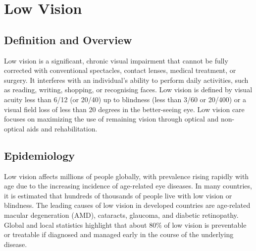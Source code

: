 \chapter{Low Vision}

\section*{Definition and Overview}
Low vision is a significant, chronic visual impairment that cannot be fully corrected with conventional spectacles, contact lenses, medical treatment, or surgery. It interferes with an individual's ability to perform daily activities, such as reading, writing, shopping, or recognising faces. Low vision is defined by visual acuity less than 6/12 (or 20/40) up to blindness (less than 3/60 or 20/400) or a visual field loss of less than 20 degrees in the better-seeing eye. Low vision care focuses on maximizing the use of remaining vision through optical and non-optical aids and rehabilitation.

\section*{Epidemiology}
Low vision affects millions of people globally, with prevalence rising rapidly with age due to the increasing incidence of age-related eye diseases. In many countries, it is estimated that hundreds of thousands of people live with low vision or blindness. The leading causes of low vision in developed countries are age-related macular degeneration (AMD), cataracts, glaucoma, and diabetic retinopathy. Global and local statistics highlight that about 80\% of low vision is preventable or treatable if diagnosed and managed early in the course of the underlying disease.

